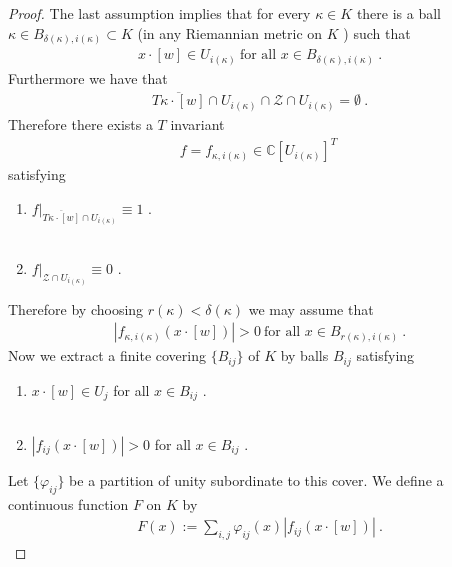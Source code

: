 \documentclass[12pt]{amsart}
\numberwithin{equation}{section}
\numberwithin{remark}{section}
\numberwithin{theorem}{section}
\numberwithin{proposition}{section}
\numberwithin{definition}{section}
\numberwithin{lemma}{section}
\numberwithin{claim}{section}
\numberwithin{corollary}{section}
\numberwithin{conjecture}{section}
\begin{document}
\begin{proof}
 The last assumption implies that for every $\kappa\in K$ there is a ball $\kappa\in B_{\delta(\kappa),i(\kappa)}\subset K$ (in any Riemannian metric on $K$ ) such that 
 \begin{align}
 x\cdot[w]\in U_{i(\kappa)} \ \mbox{for all $x\in B_{\delta(\kappa),i(\kappa)}$}\ .
 \end{align}
Furthermore we have that
\begin{align}
 \overline{T\kappa\cdot [w]}\cap U_{i(\kappa)} \cap \mathscr{Z}\cap U_{i(\kappa)}=\emptyset \ .
 \end{align}
 Therefore there exists a $T$ invariant
 \begin{align}
 f=f_{\kappa , i(\kappa)}\in \mathbb{C}[U_{i(\kappa)}]^T \ 
 \end{align}
 satisfying
 \begin{enumerate}
 \item $ f|_{ \overline{T\kappa\cdot [w]}\cap U_{i(\kappa)}}\equiv 1$ . \\
 \ \\
\item $f|_{\mathscr{Z}\cap U_{i(\kappa)}}\equiv 0 $ .
\end{enumerate}
  
 Therefore by choosing $r(\kappa)<\delta(\kappa)$ we may assume that
 \begin{align}
 |f_{\kappa , i(\kappa)}(x\cdot[w])|>0 \ \mbox{for all $x\in B_{r(\kappa),i(\kappa)}$} \ .
 \end{align}
 Now we extract a finite covering  $\{B_{ij}\}$ of $K$ by balls $B_{ij}$ satisfying
 \begin{enumerate}
 \item $x\cdot [w]\in U_{j}$  for all $x\in B_{ij}$ . \\
 \ \\
 \item $|f_{ij}(x\cdot [w])|>0$ for all $x\in B_{ij}$ .
 \end{enumerate}
 Let $\{\varphi_{ij}\}$ be a partition of unity subordinate to this cover. We define a continuous function $F$ on $K$ by
 \begin{align}
 F(x):= \sum_{i,j}\varphi_{ij}(x)|f_{ij}(x\cdot [w])| \ .
 \end{align}
 

\end{proof}
\end{document}
